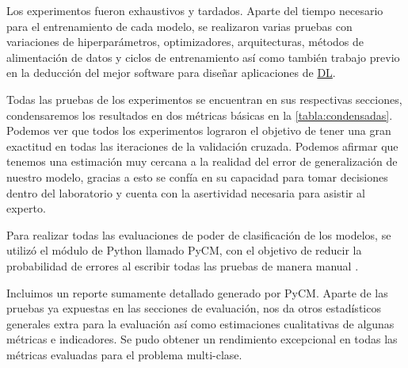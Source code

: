 Los experimentos fueron exhaustivos y tardados. Aparte del tiempo necesario para
el entrenamiento de cada modelo, se realizaron varias pruebas con variaciones de
hiperparámetros, optimizadores, arquitecturas, métodos de alimentación de datos
y ciclos de entrenamiento así como también trabajo previo en la deducción del
mejor software para diseñar aplicaciones de \hyperlink{abbr}{DL}.

Todas las pruebas de los experimentos se encuentran en sus respectivas
secciones, condensaremos los resultados en dos métricas básicas en la
\autoref{tabla:condensadas}. Podemos ver que todos los experimentos lograron el
objetivo de tener una gran exactitud en todas las iteraciones de la validación
cruzada. Podemos afirmar que tenemos una estimación muy cercana a la realidad
del error de generalización de nuestro modelo, gracias a esto se confía en su
capacidad para tomar decisiones dentro del laboratorio y cuenta con la
asertividad necesaria para asistir al experto.

\begin{table}[H]
    \centering
    \caption{Métricas condensadas de los experimentos}
    \label{tabla:condensadas}
\end{table}

Para realizar todas las evaluaciones de poder de clasificación de los modelos,
se utilizó el módulo de Python llamado PyCM, con el objetivo de
reducir la probabilidad de errores al escribir todas las pruebas de manera
manual \cite{Haghighi2018}.

Incluimos un reporte sumamente detallado generado por PyCM. Aparte de las
pruebas ya expuestas en las secciones de evaluación, nos da otros estadísticos
generales extra para la evaluación así como estimaciones cualitativas de algunas
métricas e indicadores. Se pudo obtener un rendimiento excepcional en todas las
métricas evaluadas para el problema multi-clase. 



